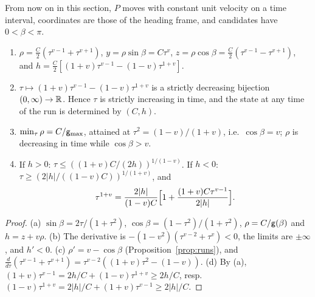 From now on in this section, $P$ moves with constant unit velocity on a time interval, coordinates are those of the heading frame,
and candidates have $0<\beta<\pi$.

\begin{lemma}\label{lem:coord}
\begin{enumerate}
\item[(a)] $\rho=\frac C2(\tau^{v-1}+\tau^{v+1})$, $y=\rho\sin\beta=C\tau^v$, $z=\rho\cos\beta=\frac C2(\tau^{v-1}-\tau^{v+1})$, and
$h=\frac C2[(1+v)\tau^{v-1}-(1-v)\tau^{1+v}]$.
\item[(b)] $\tau\mapsto(1+v)\tau^{v-1}-(1-v)\tau^{1+v}$ is a strictly decreasing bijection $(0,\infty)\to\mathbb{R}$. Hence $\tau$ is strictly
increasing in time, and the state at any time of the run is determined by $(C,h)$.
\item[(c)] $\min_\tau\rho=C/\mathsf g_{\max}$, attained at $\tau^2=(1-v)/(1+v)$, i.e.\ $\cos\beta=v$; $\rho$ is decreasing in time while
$\cos\beta>v$.
\item[(d)] If $h>0$: $\tau\le((1+v)C/(2h))^{1/(1-v)}$. If $h<0$: $\tau\ge(2|h|/((1-v)C))^{1/(1+v)}$, and
\[
\tau^{1+v}=\frac{2|h|}{(1-v)C}\Bigl[1+\frac{(1+v)C\tau^{v-1}}{2|h|}\Bigr].
\]
\end{enumerate}
\end{lemma}
\begin{proof}
(a) $\sin\beta=2\tau/(1+\tau^2)$, $\cos\beta=(1-\tau^2)/(1+\tau^2)$, $\rho=C/\mathsf g(\beta)$ and $h=z+v\rho$. (b) The derivative is
$-(1-v^2)(\tau^{v-2}+\tau^v)<0$, the limits are $\pm\infty$, and $h'<0$. (c) $\rho'=v-\cos\beta$ (Proposition~\ref{prop:runs}), and
$\frac d{d\tau}(\tau^{v-1}+\tau^{v+1})=\tau^{v-2}((1+v)\tau^2-(1-v))$. (d) By (a), $(1+v)\tau^{v-1}=2h/C+(1-v)\tau^{1+v}\ge2h/C$, resp.\
$(1-v)\tau^{1+v}=2|h|/C+(1+v)\tau^{v-1}\ge2|h|/C$.
\end{proof}

